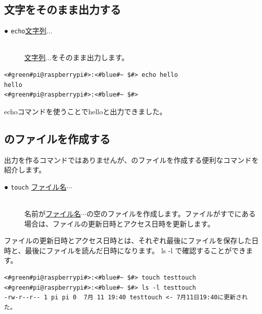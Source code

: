 \documentclass[text03.tex]{subfiles}
\begin{document}
\subsection{文字をそのまま出力する}
\begin{description}
    \item[● \texttt{echo}\textvisiblespace \underline{文字列}$\ldots$]\mbox{}\\
    \underline{文字列}$\ldots$をそのまま出力します。
    \label{cmd:echo}
\end{description}

\begin{lstlisting}[caption=echoコマンド]
<#green#pi@raspberrypi#>:<#blue#~ $#> echo hello
hello
<#green#pi@raspberrypi#>:<#blue#~ $#>
\end{lstlisting}
echoコマンドを使うことでhelloと出力できました。


\subsection{のファイルを作成する}
出力を作るコマンドではありませんが、のファイルを作成する便利なコマンドを紹介します。

\begin{description}
    \item[● \texttt{touch} \underline{ファイル名}$\cdots$]\mbox{}\\
    名前が\underline{ファイル名}$\cdots$の空のファイルを作成します。ファイルがすでにある場合は、ファイルの更新日時とアクセス日時を更新します。 
\end{description}

ファイルの更新日時とアクセス日時とは、それぞれ最後にファイルを保存した日時と、最後にファイルを読んだ日時になります。 ls -l で確認することができます。
\begin{lstlisting}[caption=空のファイルを作成, label=cmd:touch]
<#green#pi@raspberrypi#>:<#blue#~ $#> touch testtouch
<#green#pi@raspberrypi#>:<#blue#~ $#> ls -l testtouch
-rw-r--r-- 1 pi pi 0  7月 11 19:40 testtouch <- 7月11日19:40に更新された。
\end{lstlisting}

\begin{tcolorbox}[title=\useOmetoi]
    \begin{enumerate}
    \end{enumerate}
\end{tcolorbox}
\end{document}
